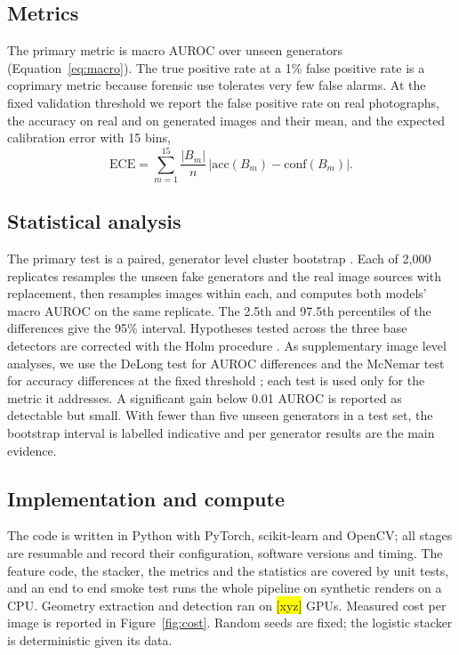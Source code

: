 \documentclass[11pt,a4paper]{article}
\newcommand{\xyz}[1][]{\colorbox{yellow}{[xyz]}}
\begin{document}
\subsection{Metrics}
\label{sec:metrics}

The primary metric is macro AUROC over unseen generators (Equation~\ref{eq:macro}). The true positive rate at a 1\% false positive rate is a coprimary metric because forensic use tolerates very few false alarms. At the fixed validation threshold we report the false positive rate on real photographs, the accuracy on real and on generated images and their mean, and the expected calibration error with 15 bins,
\begin{equation}
\mathrm{ECE} = \sum_{m=1}^{15} \frac{|B_m|}{n}\, \big|\mathrm{acc}(B_m) - \mathrm{conf}(B_m)\big| .
\label{eq:ece}
\end{equation}

\subsection{Statistical analysis}
\label{sec:stats}

The primary test is a paired, generator level cluster bootstrap \citep{field2007bootstrapping}. Each of 2{,}000 replicates resamples the unseen fake generators and the real image sources with replacement, then resamples images within each, and computes both models' macro AUROC on the same replicate. The 2.5th and 97.5th percentiles of the differences give the 95\% interval. Hypotheses tested across the three base detectors are corrected with the Holm procedure \citep{holm1979simple}. As supplementary image level analyses, we use the DeLong test for AUROC differences \citep{delong1988comparing,sun2014fast} and the McNemar test for accuracy differences at the fixed threshold \citep{mcnemar1947note}; each test is used only for the metric it addresses. A significant gain below 0.01 AUROC is reported as detectable but small. With fewer than five unseen generators in a test set, the bootstrap interval is labelled indicative and per generator results are the main evidence.

\subsection{Implementation and compute}
\label{sec:impl}

The code is written in Python with PyTorch, scikit-learn and OpenCV; all stages are resumable and record their configuration, software versions and timing. The feature code, the stacker, the metrics and the statistics are covered by unit tests, and an end to end smoke test runs the whole pipeline on synthetic renders on a CPU. Geometry extraction and detection ran on \xyz[compute.gpu]{} GPUs. Measured cost per image is reported in Figure~\ref{fig:cost}. Random seeds are fixed; the logistic stacker is deterministic given its data.
\end{document}

